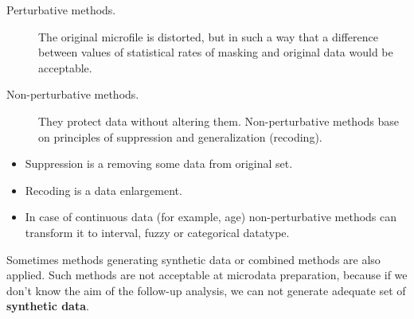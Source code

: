 \documentclass{beamer}
\begin{document}
\begin{frame}
	
	\begin{description}
		\item[Perturbative methods.] The original microfile is distorted, but in such a way that a difference between 
		values of statistical rates of masking and original data would be acceptable. 
		\item[Non-perturbative methods.] They protect data without altering them. Non-perturbative methods base on 
		principles of suppression and generalization (recoding). 
	\end{description}
\end{frame}

\begin{frame}
	
	\begin{itemize}
		\item Suppression is a removing some data from original 
		set. 
		\item Recoding is a data enlargement. 
		\item In case of continuous data (for example, age) non-perturbative methods 
		can transform it to interval, fuzzy or categorical datatype.
	\end{itemize}
	
	
	
\end{frame}
\begin{frame}
	Sometimes methods generating synthetic data or combined methods are also applied. Such methods 
	are not acceptable at microdata preparation, because if we don’t know the aim of the follow-up analysis, we 
	can not generate adequate set of \textbf{synthetic data}. 
\end{frame}
\end{document}
